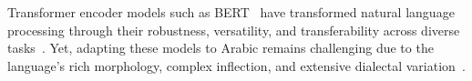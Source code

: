 \documentclass[11pt]{article}
\begin{document}












Transformer encoder models such as BERT~\cite{devlin-etal-2019-bert} have transformed natural language processing through their robustness, versatility, and transferability across diverse tasks~\cite{Gardazi2025}. Yet, adapting these models to Arabic remains challenging due to the language’s rich morphology, complex inflection, and extensive dialectal variation~\cite{MATRANE2023101570}.
\end{document}

